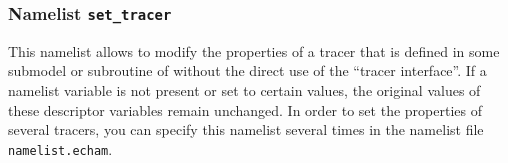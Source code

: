 \subsubsection{Namelist {\tt set\_tracer}}

This namelist allows to modify the properties of a tracer that is defined
in some submodel or subroutine of \echam{}
without the direct use of the ``tracer interface''.
If a namelist
variable is not present or set to certain values, the original values
of these descriptor variables remain unchanged.
In order to set the properties of several tracers, you can specify this
namelist several times in the namelist file {\tt namelist.echam}.

\setlength{\LTcapwidth}{\textwidth}
\setlength{\LTleft}{0pt}\setlength{\LTright}{0pt}

